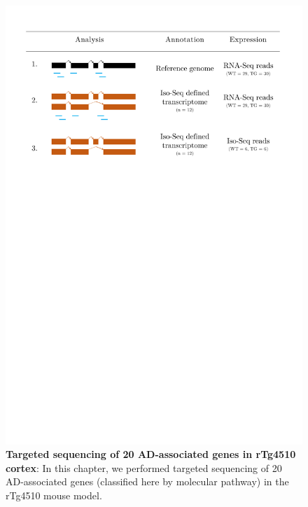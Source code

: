 \vspace{0.5cm}
\begin{figure}[htp]
	\centering
	\includegraphics[page=5,trim={1cm 32cm 1cm 0cm},clip,scale = 0.5]{Figures/Tg4510_diff_figures.pdf}
	\captionsetup{width=0.95\textwidth}
	\caption[Quantifying human-specific and mouse-specific \textit{MAPT}/\textit{Mapt} sequences in Iso-Seq Whole Transcriptome]%
	{\textbf{Targeted sequencing of 20 AD-associated genes in rTg4510 cortex}: In this chapter, we performed targeted sequencing of 20 AD-associated genes (classified here by molecular pathway) in the rTg4510 mouse model.}
	\label{fig:targeted_genes}
\end{figure}

